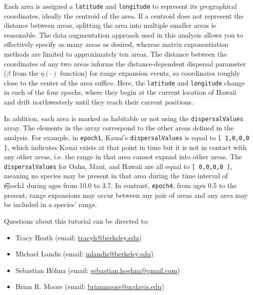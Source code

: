 Each area is assigned a {\tt latitude} and {\tt longitude} to represent its geographical coordinates, ideally the centroid of the area.
If a centroid does not represent the distance between areas, splitting the area into multiple smaller areas is reasonable.
The data augmentation approach used in this analysis allows you to effectively specify as many areas as desired, whereas matrix exponentiation methods are limited to approximately ten areas.
The distance between the coordinates of any two areas informs the distance-dependent dispersal parameter ($\beta$ from the $\eta(\cdot)$ function) for range expansion events, so coordinates roughly close to the center of the area suffice.
Here, the {\tt latitude} and {\tt longitude} change in each of the four epochs, where they begin at the current location of Hawaii and drift northwesterly until they reach their current positions.

In addition, each area is marked as habitable or not using the {\tt dispersalValues} array.
The elements in the array correspond to the other areas defined in the analysis.
For example, in {\tt epoch1}, Kauai's {\tt dispersalValues} is equal to {\tt [ 1,0,0,0 ]}, which indicates Kauai exists at that point in time but it is not in contact with any other areas, i.e. the range in that area cannot expand into other areas.
The {\tt dispersalValues} for Oahu, Maui, and Hawaii are all equal to {\tt [ 0,0,0,0 ]}, meaning no species may be present in that area during the time interval of {\t epoch1} during ages from 10.0 to 3.7. In contrast, {\tt epoch4}, from ages 0.5 to the present, range expansions may occur between any pair of areas and any area may be included in a species' range.


\vspace{5cm}
Questions about this tutorial can be directed to: \\\vspace{-10mm}
\begin{itemize}
\item Tracy Heath (email: \href{mailto:tracyh@berkeley.edu}{tracyh@berkeley.edu}) \\\vspace{-8mm}
\item Michael Landis (email: \href{mailto:mlandis@berkeley.edu}{mlandis@berkeley.edu}) \\\vspace{-8mm} 
\item Sebastian H\"{o}hna (email: \href{mailto:sebastian.hoehna@gmail.com}{sebastian.hoehna@gmail.com}) \\\vspace{-8mm}
\item Brian R. Moore (email: \href{mailto:brianmoore@ucdavis.edu}{brianmoore@ucdavis.edu}) \\\vspace{-8mm}
\end{itemize}


%
%
